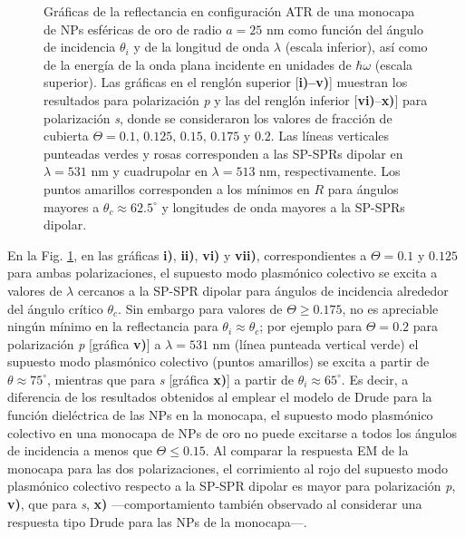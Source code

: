 \begin{figure}[t!]
\vspace*{-.5em}	
	\caption{Gráficas de la reflectancia en configuración ATR  de una monocapa de NPs esféricas de oro de radio $a=25$ nm como función del ángulo de incidencia $\theta_i$ y de la longitud de onda $\lambda$ (escala inferior), así como de la energía de la onda plana incidente en unidades de $\hbar\omega$ (escala superior).  Las gráficas   en el renglón superior [\textbf{i)--v)}] muestran los resultados para  polarización \emph{p} y las del renglón inferior  [\textbf{vi)}--\textbf{x)}]  para polarización  \emph{s}, donde se consideraron los valores de fracción de cubierta $\Theta =  0.1,\,0.125,\,0.15,\, 0.175$ y $0.2$.  Las líneas verticales punteadas verdes y rosas corresponden a las SP-SPRs dipolar en $\lambda=531$ nm y  cuadrupolar en $\lambda=513$ nm, respectivamente.  Los puntos amarillos corresponden a los mínimos en $R$ para ángulos mayores a $\theta_c\approx 62.5^\circ$ y longitudes de onda mayores a la SP-SPRs dipolar.
}	\label{fig:Au-R-Theta}	
	\end{figure}	

En la Fig.  \ref{fig:Au-R-Theta}, en las gráficas \textbf{i)}, \textbf{ii)}, \textbf{vi)} y \textbf{vii)}, correspondientes a $\Theta=0.1$ y $0.125$ para ambas polarizaciones, el supuesto modo plasmónico colectivo se excita a valores de $\lambda$ cercanos a la SP-SPR dipolar para ángulos de incidencia alrededor del ángulo crítico $\theta_c$. Sin embargo para valores de $\Theta\geq 0.175$, no es apreciable ningún mínimo en la reflectancia para $\theta_i\approx\theta_c$; por ejemplo para $\Theta=0.2$ para polarización \emph{p} [gráfica \textbf{v)}] a $\lambda = 531$ nm (línea punteada vertical verde) el supuesto modo plasmónico colectivo (puntos amarillos) se excita a partir de $\theta\approx 75^\circ$, mientras que para \emph{s} [gráfica \textbf{x)}] a partir de $\theta_i\approx 65^\circ$. Es decir, a diferencia de los resultados obtenidos al emplear el modelo de Drude para la función dieléctrica de las NPs en la monocapa, el supuesto modo plasmónico colectivo en una monocapa de NPs de oro no puede excitarse a todos los ángulos de incidencia a menos que $\Theta\leq 0.15$. Al comparar la respuesta EM de la monocapa para las dos polarizaciones, el corrimiento al rojo del supuesto modo plasmónico colectivo respecto a la SP-SPR dipolar es mayor  para polarización \emph{p}, \textbf{v)}, que para \emph{s}, \textbf{x)} ---comportamiento también observado al considerar una respuesta tipo Drude para las NPs de la monocapa---.

